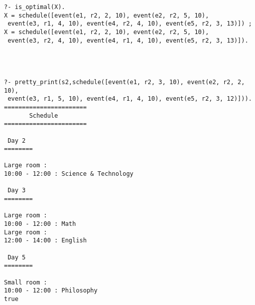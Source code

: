 \documentclass[a4paper]{article}
\begin{document}
\begin{lstlisting}[style=Linux]
?- is_optimal(X).
X = schedule([event(e1, r2, 2, 10), event(e2, r2, 5, 10),
 event(e3, r1, 4, 10), event(e4, r2, 4, 10), event(e5, r2, 3, 13)]) ;
X = schedule([event(e1, r2, 2, 10), event(e2, r2, 5, 10),
 event(e3, r2, 4, 10), event(e4, r1, 4, 10), event(e5, r2, 3, 13)]).
 



?- pretty_print(s2,schedule([event(e1, r2, 3, 10), event(e2, r2, 2, 10),
 event(e3, r1, 5, 10), event(e4, r1, 4, 10), event(e5, r2, 3, 12)])).
=======================
       Schedule
=======================

 Day 2 
========

Large room :
10:00 - 12:00 : Science & Technology

 Day 3 
========

Large room :
10:00 - 12:00 : Math
Large room :
12:00 - 14:00 : English

 Day 5 
========

Small room :
10:00 - 12:00 : Philosophy
true 


\end{lstlisting}
\end{document}

